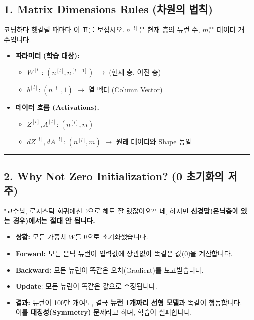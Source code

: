 \documentclass[11pt,a4paper]{book}
\theoremstyle{definition}
\begin{document}
\subsection{1. Matrix Dimensions Rules (차원의 법칙)}
코딩하다 헷갈릴 때마다 이 표를 보십시오. $n^{[l]}$은 현재 층의 뉴런 수, $m$은 데이터 개수입니다.

\begin{tcolorbox}[colback=white, colframe=black, title=Shape Cheat Sheet]
\begin{itemize}
    \item \textbf{파라미터 (학습 대상):}
    \begin{itemize}
        \item $W^{[l]}$: $(n^{[l]}, n^{[l-1]})$ $\rightarrow$ (현재 층, 이전 층)
        \item $b^{[l]}$: $(n^{[l]}, 1)$ $\rightarrow$ 열 벡터 (Column Vector)
    \end{itemize}
    \item \textbf{데이터 흐름 (Activations):}
    \begin{itemize}
        \item $Z^{[l]}, A^{[l]}$: $(n^{[l]}, m)$
        \item $dZ^{[l]}, dA^{[l]}$: $(n^{[l]}, m)$ $\rightarrow$ 원래 데이터와 Shape 동일
    \end{itemize}
\end{itemize}
\end{tcolorbox}

\vspace{0.5cm}\hrule\vspace{0.5cm}

\subsection{2. Why Not Zero Initialization? (0 초기화의 저주)}
"교수님, 로지스틱 회귀에선 0으로 해도 잘 됐잖아요?"
네, 하지만 \textbf{신경망(은닉층이 있는 경우)에서는 절대 안 됩니다.}

\begin{analogybox}[title={복제 인간 군대 비유}]
\begin{itemize}
    \item \textbf{상황:} 모든 가중치 $W$를 0으로 초기화했습니다.
    \item \textbf{Forward:} 모든 은닉 뉴런이 입력값에 상관없이 똑같은 값(0)을 계산합니다.
    \item \textbf{Backward:} 모든 뉴런이 똑같은 오차(Gradient)를 보고받습니다.
    \item \textbf{Update:} 모든 뉴런이 똑같은 값으로 수정됩니다.
    \item \textbf{결과:} 뉴런이 100만 개여도, 결국 \textbf{뉴런 1개짜리 선형 모델}과 똑같이 행동합니다. 이를 \textbf{대칭성(Symmetry)} 문제라고 하며, 학습이 실패합니다.
\end{itemize}
\end{analogybox}
\end{document}
